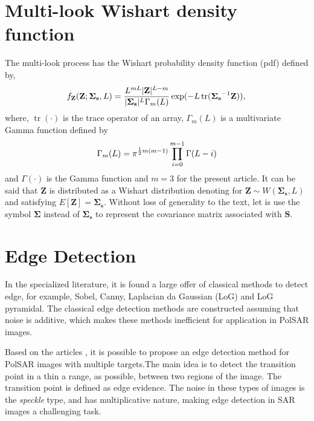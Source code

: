 \documentclass[conference]{IEEEtran}
\DeclareMathOperator{\traco}{tr}
\begin{document}
\section{Multi-look Wishart density function}\label{sec_03}
The multi-look process has the Wishart probability density function (pdf) defined by,
\begin{equation}\label{eq_05}
    f_{\mathbf{Z}}(\mathbf{Z};\mathbf{\Sigma_{s}},L)=\frac{L^{mL}|\mathbf{Z}|^{L-m}}{|\mathbf{\Sigma_{s}}|^{L}\Gamma_m(L)} \exp(-L\traco(\mathbf{\Sigma_{s}}^{-1}\mathbf{Z})), \\
\end{equation} 
where, $\traco(\cdot)$ is the trace operator of an array, $\Gamma_m(L)$ is a multivariate Gamma function defined by
\begin{equation*}
	\Gamma_m(L)=\pi^{\frac{1}{2}m(m-1)} \prod_{i=0}^{m-1}\Gamma(L-i) \\
\end{equation*}
and $\Gamma(\cdot)$ is the Gamma function and $m=3$ for the present article. It can be said that $\mathbf{Z}$ is distributed as a Wishart distribution denoting for $\mathbf{Z}\sim W(\mathbf{\Sigma_{s}}, L)$ and satisfying $E[\mathbf{Z}]=\mathbf{\Sigma_{s}}$. Without loss of generality to the text, let is use the symbol $\mathbf{\Sigma}$ instead of $\mathbf{\Sigma_{s}}$ to represent the covariance matrix associated with $\mathbf{S}$.

\section{Edge Detection}\label{sec_04}
In the specialized literature, it is found a large offer of classical methods to detect edge, for example, Sobel, Canny, Laplacian da Gaussian (LoG) and LoG pyramidal. The classical edge detection methods are constructed assuming that noise is additive, which makes these methods inefficient for application in PolSAR images.

Based on the articles \cite{nhfc, gmbf}, it is possible to propose an edge detection method for PolSAR images with multiple targets.The main idea is to detect the transition point in a thin a range, as possible, between two regions of the image. The transition point is defined as edge evidence. The noise in these types of images is the \textit{speckle} type, and has multiplicative nature, making edge detection in SAR images a challenging task.
\end{document}
